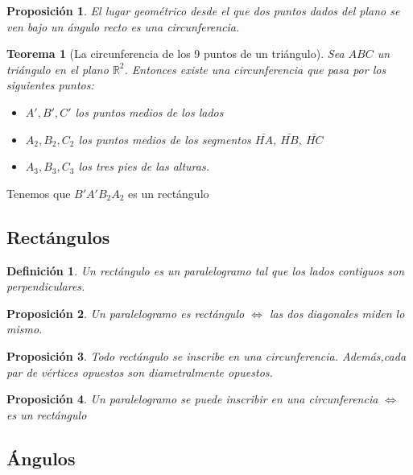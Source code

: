 \documentclass[11pt, a4paper, titlepage]{article}
\makeatletter
\renewenvironment{proof}[1][\proofname] {\vspace{-15pt}\par\pushQED{\qed}\normalfont\topsep6\p@\@plus6\p@\relax\trivlist\item[\hskip\labelsep\it#1\@addpunct{.}]\ignorespaces}{\popQED\endtrivlist\@endpefalse}
\newcommand{\R}{\mathbb{R}}
\theoremstyle{theorem-style}
\newtheorem*{nth}{Teorema}
\newtheorem*{nprop}{Proposición}
\theoremstyle{definition-style}
\newtheorem*{ndef}{Definición}
\theoremstyle{remark-style}
\theoremstyle{example-style}
\makeatother
\begin{document}
\begin{nprop}
  El lugar geométrico desde el que dos puntos dados del plano se ven bajo un ángulo recto es una circunferencia.
\end{nprop}

\begin{nth}[La circunferencia de los 9 puntos de un triángulo]
  Sea $ABC$ un triángulo en el plano $\R^2$. Entonces existe una circunferencia que pasa por los siguientes puntos:
  \begin{itemize}
  \item $A',B',C'$ los puntos medios de los lados
  \item $A_2,B_2,C_2$ los puntos medios de los segmentos $\bar{HA}$, $\bar{HB}$, $\bar{HC}$
  \item $A_3,B_3,C_3$ los tres pies de las alturas.
  \end{itemize}
\end{nth}
\begin{proof}
  Tenemos que $B'A'B_2A_2$ es un rectángulo
\end{proof}



\subsection{Rectángulos}
\begin{ndef}
  Un rectángulo es un paralelogramo tal que los lados contiguos son perpendiculares.
\end{ndef}

\begin{nprop}
  Un paralelogramo es rectángulo $\iff$ las dos diagonales miden lo mismo.
\end{nprop}

\begin{nprop}
  Todo rectángulo se inscribe en una circunferencia. Además,cada par de vértices opuestos son diametralmente opuestos.
\end{nprop}

\begin{nprop}
  Un paralelogramo se puede inscribir en una circunferencia $\iff$ es un rectángulo
\end{nprop}

\subsection{Ángulos}
\end{document}
